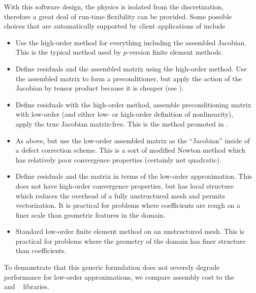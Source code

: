 With this software design, the physics is isolated from the discretization, therefore a great deal of run-time flexibility can be provided.
Some possible choices that are automatically supported by client applications of {\Dohp} include
\begin{itemize}
\item Use the high-order method for everything including the assembled Jacobian.
  This is the typical method used by $p$-version finite element methods.
\item Define residuals and the assembled matrix using the high-order method.
  Use the assembled matrix to form a preconditioner, but apply the action of the Jacobian by tensor product because it is cheaper (see ).
\item Define residuals with the high-order method, assemble preconditioning matrix with low-order (and either low- or high-order definition of nonlinearity), apply the true Jacobian matrix-free.
  This is the method promoted in .
\item As above, but use the low-order assembled matrix as the ``Jacobian'' inside of a defect correction scheme.
  This is a sort of modified Newton method which has relatively poor convergence properties (certainly not quadratic).
\item Define residuals and the matrix in terms of the low-order approximation.
  This does not have high-order convergence properties, but has local structure which reduces the overhead of a fully unstructured mesh and permits vectorization.
  It is practical for problems where coefficients are rough on a finer scale than geometric features in the domain.
\item Standard low-order finite element method on an unstructured mesh.
  This is practical for problems where the geometry of the domain has finer structure than coefficients.
\end{itemize}

To demonstrate that this generic formulation does not severely degrade performance for low-order approximations, we compare assembly cost to the {\libmesh}~\cite{libmesh} and {\dealii}~\cite{bangerth2007deal} libraries.

